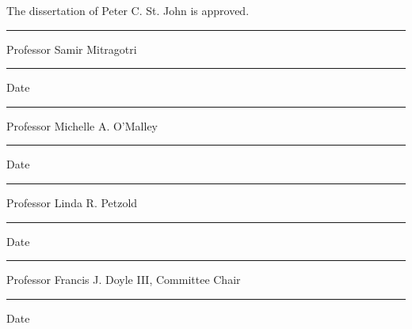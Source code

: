 \thispagestyle{empty}
The dissertation of Peter C. St. John is approved.
\vfil
\begin{minipage}{0.65\textwidth}
  \rule{\textwidth}{0.7pt}
  {\sc Professor Samir Mitragotri}
\end{minipage}
\hfill
\begin{minipage}{0.25\textwidth}
  \rule{\textwidth}{0.7pt}
  {\sc Date}
\end{minipage}

\vfil
\begin{minipage}{0.65\textwidth}
  \rule{\textwidth}{0.7pt}
  {\sc Professor Michelle A. O'Malley}
\end{minipage}
\hfill
\begin{minipage}{0.25\textwidth}
  \rule{\textwidth}{0.7pt}
  {\sc Date}
\end{minipage}

\vfil
\begin{minipage}{0.65\textwidth}
  \rule{\textwidth}{0.7pt}
  {\sc Professor Linda R. Petzold}
\end{minipage}
\hfill
\begin{minipage}{0.25\textwidth}
  \rule{\textwidth}{0.7pt}
  {\sc Date}
\end{minipage}

\vfil
\begin{minipage}{0.65\textwidth}
  \rule{\textwidth}{0.7pt}
  {\sc Professor Francis J. Doyle III, Committee Chair}
\end{minipage}
\hfill
\begin{minipage}{0.25\textwidth}
  \rule{\textwidth}{0.7pt}
  {\sc Date}
\end{minipage}

